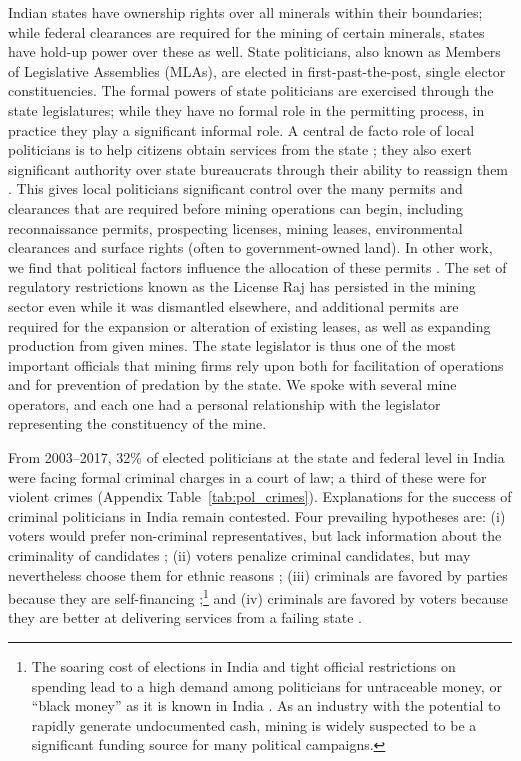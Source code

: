 \documentclass[12pt,letterpaper]{article}
\begin{document}
Indian states have ownership rights over all minerals within their
boundaries; while federal clearances are required for the mining of
certain minerals, states have hold-up power over these as well.  State
politicians, also known as Members of Legislative Assemblies (MLAs),
are elected in first-past-the-post, single elector constituencies. The
formal powers of state politicians are exercised through the state
legislatures; while they have no formal role in the permitting
process, in practice they play a significant informal
role. A central de facto role of local politicians is to help
citizens obtain services from the state
\cite{Berenschot2011,Jensenius2013a}; they also exert significant
authority over state bureaucrats through their ability to reassign
them \cite{Iyer2012a,Vaishnav2017}. This gives local politicians
significant control over the many permits and clearances that are
required before mining operations can begin, including reconnaissance
permits, prospecting licenses, mining leases, environmental clearances
and surface rights (often to government-owned land). In other work, we
find that political factors influence the allocation of these permits
\cite{an2017pols}. The set of regulatory restrictions known as the
License Raj has persisted in the mining sector even while it was
dismantled elsewhere, and additional permits are required for the
expansion or alteration of existing leases, as well as expanding
production from given mines. The state legislator is thus one of the
most important officials that mining firms rely upon both for
facilitation of operations and for prevention of predation by the
state. We spoke with several mine operators, and each one had a
personal relationship with the legislator representing the
constituency of the mine.

From 2003--2017, 32\% of elected politicians at the state and federal
level in India were facing formal criminal charges in a court of law;
a third of these were for violent crimes (Appendix
Table~\ref{tab:pol_crimes}). Explanations for the success of criminal
politicians in India remain contested. Four prevailing hypotheses are:
(i) voters would prefer non-criminal representatives, but lack
information about the criminality of candidates
\cite{Banerjee2012b,Pande2011}; (ii) voters penalize criminal
candidates, but may nevertheless choose them for ethnic reasons
\cite{Chauchard2014a}; (iii) criminals are favored by parties because
they are self-financing \cite{Vaishnav2017};\footnote{The soaring cost
  of elections in India and tight official restrictions on spending
  lead to a high demand among politicians for untraceable money, or
  ``black money'' as it is known in India \cite{Vaishnav2017}. As an
  industry with the potential to rapidly generate undocumented cash,
  mining is widely suspected to be a significant funding source for
  many political campaigns.} and (iv) criminals are favored by voters
because they are better at delivering services from a failing state
\cite{Vaishnav2017}.
\end{document}
